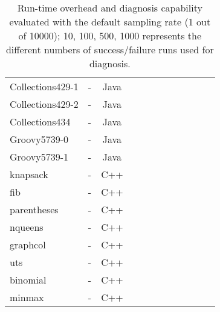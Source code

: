 \begin{table}[h!]
\begin{tabular}{lccccccccccc}
    Collections429-1    &  -  & Java  &  &              &    &                                 &                   &                           &                  &&              \\
    Collections429-2    &  -  & Java  &  &              &    &                                 &                   &                           &                  &&              \\
    Collections434    & -   & Java  &  &              &    &                                 &                   &                           &                    &&            \\
    \midrule
    Groovy5739-0      & -  & Java  &  &              &    &                                 &                   &                           &                     &&           \\
    Groovy5739-1      & -  & Java  &  &              &    &                                 &                   &                           &                     &&          \\
    \midrule
    \midrule
    knapsack      &  -  & C++  &  &              &    &                                 &                   &                           &                         &&     \\
    fib      &  - & C++  &  &              &    &                                 &                   &                           &                               && \\
    parentheses      & -   & C++  &  &              &    &                                 &                   &                           &                      &&          \\
    nqueens      &  -  & C++  &  &              &    &                                 &                   &                           &                          &&      \\
    graphcol      &  -  & C++  &  &              &    &                                 &                   &                           &                         &&     \\
    uts      &  -  & C++  &  &              &    &                                 &                   &                           &                              && \\
    binomial      &  -  & C++  &  &              &    &                                 &                   &                           &                         &&       \\
    minmax      &  -  & C++  &  &              &    &                                 &                   &                           &                           &&    \\


    \bottomrule
   \end{tabular}
  \caption{Run-time overhead and diagnosis capability evaluated with the default sampling rate (1 out of 10000); 10, 100, 500, 1000 represents the different numbers of success/failure runs used for diagnosis.}
  \label{tab:LBR}
\end{table}